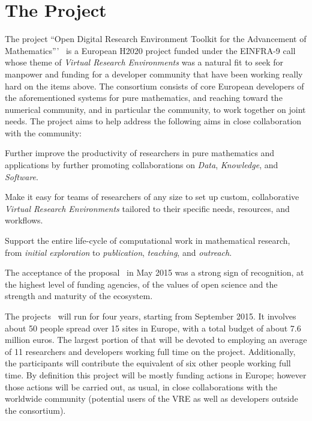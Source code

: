 \section{The \ODK Project}
The project ``Open Digital Research Environment Toolkit for the Advancement of
Mathematics'''~\cite{OpenDreamKit:on} is a European H2020 project funded under the
EINFRA-9 call~\cite{EINFRA-9} whose theme of \emph{Virtual Research Environments} was a
natural fit to seek for manpower and funding for a developer community that have been
working really hard on the items above. The \ODK consortium consists of core European
developers of the aforementioned systems for pure mathematics, and reaching toward the
numerical community, and in particular the \Jupyter community, to work together on joint
needs. The project aims to help address the following aims in close collaboration with the
community:
\begin{compactenum}
\item Further improve the productivity of researchers in pure mathematics and applications
  by further promoting collaborations on \emph{Data}, \emph{Knowledge}, and
  \emph{Software}.
\item Make it easy for teams of researchers of any size to set up custom, collaborative
  \emph{Virtual Research Environments} tailored to their specific needs, resources, and
  workflows.
\item Support the entire life-cycle of computational work in mathematical research, from
  \emph{initial exploration} to \emph{publication}, \emph{teaching}, and \emph{outreach}.
\end{compactenum}
The acceptance of the proposal~\cite{ODKproposal:on} in May 2015 was a strong sign of
recognition, at the highest level of funding agencies, of the values of open science and
the strength and maturity of the ecosystem.

The \ODK projects~\cite{ODKproposal:on} will run for four years, starting from September
2015. It involves about 50 people spread over 15 sites in Europe, with a total budget of
about 7.6 million euros. The largest portion of that will be devoted to employing an
average of 11 researchers and developers working full time on the project. Additionally,
the participants will contribute the equivalent of six other people working full time.  By
definition this project will be mostly funding actions in Europe; however those actions
will be carried out, as usual, in close collaborations with the worldwide community
(potential users of the VRE as well as developers outside the \ODK consortium).

